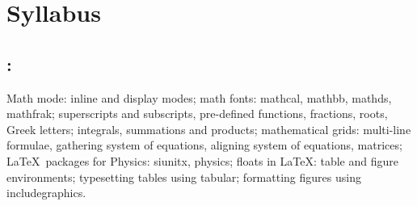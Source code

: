 \section*{Syllabus}

    \subsection*{\topicSubTitle: \topicTitle}
        Math mode: inline and display modes; math fonts: mathcal, mathbb, mathds, mathfrak; superscripts and subscripts, pre-defined functions, fractions, roots, Greek letters; integrals, summations and products; mathematical grids: multi-line formulae, gathering system of equations, aligning system of equations, matrices; \LaTeX\ packages for Physics: siunitx, physics; floats in \LaTeX: table and figure environments; typesetting tables using tabular; formatting figures using includegraphics.